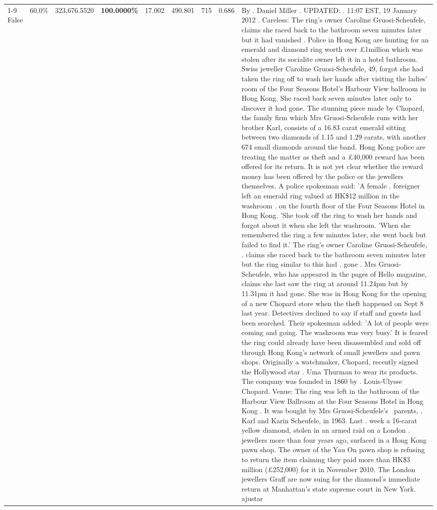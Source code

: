 \begin{table}[H]
\begin{tabular}{lllrlllll}
\cline{1-9}
False & 60.0\% & 323,676.5520 & \bfseries \color{red} 100.0000\% & 17.002 & 490.801 & 715 & 0.686 & By . Daniel Miller . UPDATED: . 11:07 EST, 19 January 2012 . Careless: The ring's owner Caroline Gruosi-Scheufele, claims she raced back to the bathroom seven minutes later but it had vanished . Police in Hong Kong are hunting for an emerald and diamond ring worth over £1million which was stolen after its socialite owner left it in a hotel bathroom. Swiss jeweller Caroline Gruosi-Scheufele, 49, forgot she had taken the ring off to wash her hands after visiting the ladies' room of the Four Seasons Hotel's Harbour View ballroom in Hong Kong. She raced back seven minutes later only to discover it had gone. The stunning piece made by Chopard, the family firm which Mrs Gruosi-Scheufele runs with her brother Karl, consists of a 16.83 carat emerald sitting between two diamonds of 1.15 and 1.29 carats, with another 674 small diamonds around the band. Hong Kong police are treating the matter as theft and a £40,000 reward has been offered for its return. It is not yet clear whether the reward money has been offered by the police or the jewellers themselves. A police spokesman said: 'A female . foreigner left an emerald ring valued at HK\$12 million in the washroom . on the fourth floor of the Four Seasons Hotel in Hong Kong. 'She took off the ring to wash her hands and forgot about it when she left the washroom. 'When she remembered the ring a few minutes later, she went back but failed to find it.' The ring's owner Caroline Gruosi-Scheufele, . claims she raced back to the bathroom seven minutes later but the ring similar to this had . gone . Mrs Gruosi-Scheufele, who has appeared in the pages of Hello magazine, claims she last saw the ring at around 11.24pm but by 11.31pm it had gone. She was in Hong Kong for the opening of a new Chopard store when the theft happened on Sept 8 last year. Detectives declined to say if staff and guests had been searched. Their spokesman added: 'A lot of people were coming and going. The washroom was very busy.' It is feared the ring could already have been disassembled and sold off through Hong Kong's network of small jewellers and pawn shops. Originally a watchmaker, Chopard, recently signed the Hollywood star . Uma Thurman to wear its products. The company was founded in 1860 by . Louis-Ulysse Chopard. Venue: The ring was left in the bathroom of the Harbour View Ballroom at the Four Seasons Hotel in Hong Kong . It was bought by Mrs Gruosi-Scheufele's  parents, . Karl and Karin Scheufele, in 1963. Last . week a 16-carat yellow diamond, stolen in an armed raid on a London . jewellers more than four years ago, surfaced in a Hong Kong pawn shop. The owner of the Yau On pawn shop is refusing to return the item claiming they paid more than HK\$3 million (£252,000) for it in November 2010. The London jewellers Graff are now suing for the diamond’s immediate return at Manhattan’s state supreme court in New York. ajustar \\

\end{tabular}
\end{table}
